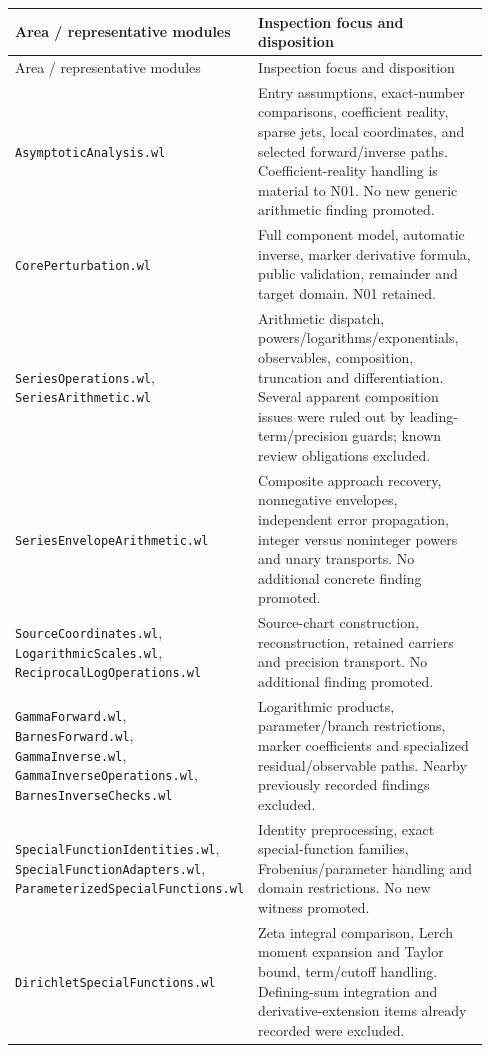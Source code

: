 \documentclass[11pt,letterpaper]{article}
\newcommand{\code}[1]{\nolinkurl{#1}}
\begin{document}
{\small
\begin{longtable}{@{}p{0.36\linewidth}p{0.58\linewidth}@{}}
\toprule
Area / representative modules & Inspection focus and disposition\\
\midrule
\endfirsthead
\toprule Area / representative modules & Inspection focus and disposition\\\midrule
\endhead
\bottomrule\endfoot
\code{AsymptoticAnalysis.wl} & Entry assumptions, exact-number comparisons, coefficient reality, sparse jets, local coordinates, and selected forward/inverse paths. Coefficient-reality handling is material to N01. No new generic arithmetic finding promoted.\\
\code{CorePerturbation.wl} & Full component model, automatic inverse, marker derivative formula, public validation, remainder and target domain. N01 retained.\\
\code{SeriesOperations.wl}, \code{SeriesArithmetic.wl} & Arithmetic dispatch, powers/logarithms/exponentials, observables, composition, truncation and differentiation. Several apparent composition issues were ruled out by leading-term/precision guards; known review obligations excluded.\\
\code{SeriesEnvelopeArithmetic.wl} & Composite approach recovery, nonnegative envelopes, independent error propagation, integer versus noninteger powers and unary transports. No additional concrete finding promoted.\\
\code{SourceCoordinates.wl}, \code{LogarithmicScales.wl}, \code{ReciprocalLogOperations.wl} & Source-chart construction, reconstruction, retained carriers and precision transport. No additional finding promoted.\\
\code{GammaForward.wl}, \code{BarnesForward.wl}, \code{GammaInverse.wl}, \code{GammaInverseOperations.wl}, \code{BarnesInverseChecks.wl} & Logarithmic products, parameter/branch restrictions, marker coefficients and specialized residual/observable paths. Nearby previously recorded findings excluded.\\
\code{SpecialFunctionIdentities.wl}, \code{SpecialFunctionAdapters.wl}, \code{ParameterizedSpecialFunctions.wl} & Identity preprocessing, exact special-function families, Frobenius/parameter handling and domain restrictions. No new witness promoted.\\
\code{DirichletSpecialFunctions.wl} & Zeta integral comparison, Lerch moment expansion and Taylor bound, term/cutoff handling. Defining-sum integration and derivative-extension items already recorded were excluded.\\

\end{longtable}}
\end{document}
